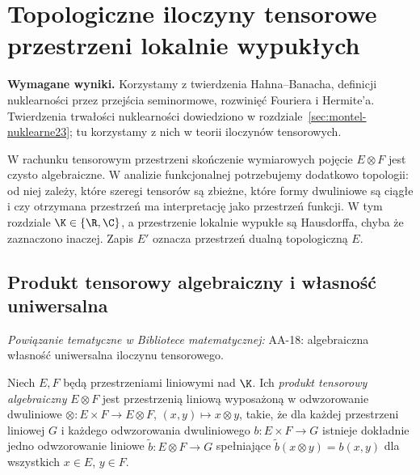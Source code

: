 \setcounter{section}{8}
\section{Topologiczne iloczyny tensorowe przestrzeni lokalnie wypukłych}
\label{sec:tensor24}

\providecommand{\atlasref}[2]{#2}


\noindent\textbf{Wymagane wyniki.} Korzystamy z twierdzenia
Hahna--Banacha, definicji nuklearności przez przejścia seminormowe,
rozwinięć Fouriera i Hermite'a. Twierdzenia trwałości nuklearności
dowiedziono w rozdziale~\ref{sec:montel-nuklearne23}; tu korzystamy z nich
w teorii iloczynów tensorowych.
\medskip

W rachunku tensorowym przestrzeni skończenie wymiarowych pojęcie
$E\otimes F$ jest czysto algebraiczne. W analizie funkcjonalnej
potrzebujemy dodatkowo topologii: od niej zależy, które szeregi
tensorów są zbieżne, które formy dwuliniowe są ciągłe i czy
otrzymana przestrzeń ma interpretację jako przestrzeń funkcji.
W tym rozdziale $\K\in\{\R,\C\}$, a przestrzenie lokalnie wypukłe
są Hausdorffa, chyba że zaznaczono inaczej. Zapis $E'$ oznacza
przestrzeń dualną topologiczną $E$.

\subsection{Produkt tensorowy algebraiczny i własność uniwersalna}

\noindent\emph{Powiązanie tematyczne w Bibliotece matematycznej:} \atlasref{AA-18::aa:tw:tensor-universal}{AA-18: algebraiczna własność uniwersalna iloczynu tensorowego}.


\begin{definicja}
\label{def:alg-tensor24}
Niech $E,F$ będą przestrzeniami liniowymi nad $\K$.
Ich \emph{produkt tensorowy algebraiczny} $E\otimes F$ jest
przestrzenią liniową wyposażoną w odwzorowanie dwuliniowe
$\otimes:E\times F\to E\otimes F$, $ (x,y)\mapsto x\otimes y$,
takie, że dla każdej przestrzeni liniowej $G$ i każdego
odwzorowania dwuliniowego $b:E\times F\to G$ istnieje dokładnie
jedno odwzorowanie liniowe $\widetilde b:E\otimes F\to G$
spełniające $\widetilde b(x\otimes y)=b(x,y)$ dla wszystkich
$x\in E$, $y\in F$.
\end{definicja}

